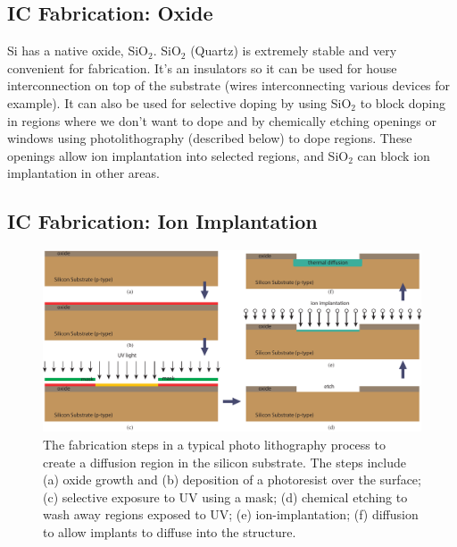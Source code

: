 \subsection{IC Fabrication: Oxide}

Si has a native oxide, SiO$_2$.  SiO$_2$ (Quartz) is extremely stable and very convenient for fabrication.   It’s an insulators so it can be used for house interconnection on top of the substrate (wires interconnecting various devices for example).   It can also be used for selective doping by using SiO$_2$ to block doping in regions where we don't want to dope and by chemically etching openings or windows  using photolithography (described below) to dope regions.   These openings allow ion implantation into selected regions, and 
 SiO$_2$ can block ion implantation in other areas.
 


\subsection{IC Fabrication: Ion Implantation}

\begin{figure}[tb]
\begin{center}
\includegraphics[width=\columnwidth]{process_steps}
\end{center}
\caption{The fabrication steps in a typical photo lithography process to create a diffusion region in the silicon substrate.  The steps include (a) oxide growth and (b) deposition of a photoresist over the surface; (c) selective exposure to UV using a mask; (d) chemical etching to wash away regions exposed to UV; (e) ion-implantation; (f) diffusion to allow implants to diffuse into the structure.} \label{fig:mod2-2_ICtech_sld_4}
\end{figure}

